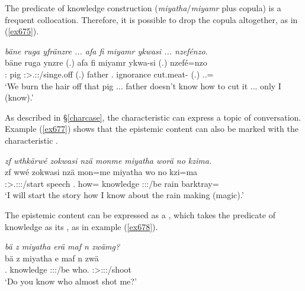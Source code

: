 The predicate of knowledge construction (\emph{miyatha}/\emph{miyamr} plus copula) is a frequent collocation. Therefore, it is possible to drop the copula altogether, as in (\ref{ex675}).

\begin{exe}
	\ex \emph{bäne ruga yfränzre ... afa fi miyamr ykwasi ... nzefénzo.}\\
	\gll bäne ruga ynzre (.) afa fi miyamr ykwa-si (.) nzefé=nzo\\
	\Dem:\Med{} pig \Fpl:\Sbj>\Tsg.\Masc:\Nonpast:\Ipfv/singe.off (.) father \Third.{\Abs} ignorance cut.meat-{\Nmlz} (.) \Fsg.\Erg.\Emph={\Only}\\
	\trans `We burn the hair off that pig ... father doesn't know how to cut it ... only I (know).'
	\label{ex676}
\end{exe}

As described in {\S}\ref{charcase}, the characteristic  can express a topic of conversation. Example (\ref{ex677}) shows that the epistemic content can also be marked with the characteristic .

\begin{exe}
	\ex \emph{zf wthkärwé zokwasi nzä monme miyatha worä no kzima.}\\
	\gll zf wwé zokwasi nzä mon=me miyatha wo no kzi=ma\\
	{\Imm} \Fsg:\Sbj>\Tsg.\F:\Obj:\Nonpast:\Ipfv/start speech \Fsg.{\Abs} how={\Ins} knowledge \Fsg:\Sbj:\Nonpast:\Ipfv/be rain barktray={\Char}\\
	\trans `I will start the story how I know about the rain making (magic).'\\
	\label{ex677}
\end{exe}

The epistemic content can be expressed as a , which takes the predicate of knowledge as its , as in example (\ref{ex678}).

\begin{exe}
	\ex \emph{bä z miyatha erä maf n zwämg?}\\
	\gll bä z miyatha e maf n zwä\\
	\Second.{\Abs} {\Iam} knowledge \Stpl:\Sbj:\Nonpast:\Ipfv/be who.{\Erg} {\Imn} \Stsg:\Sbj>\Fsg:\Obj:\Rpst:\Pfv/shoot\\
	\trans `Do you know who almost shot me?'
	\label{ex678}
\end{exe}

